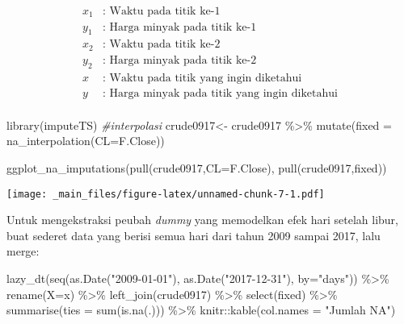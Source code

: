 \documentclass[
]{book}
\newenvironment{Shaded}{\begin{snugshade}}{\end{snugshade}}
\newcommand{\AttributeTok}[1]{\textcolor[rgb]{0.77,0.63,0.00}{#1}}
\newcommand{\CommentTok}[1]{\textcolor[rgb]{0.56,0.35,0.01}{\textit{#1}}}
\newcommand{\FunctionTok}[1]{\textcolor[rgb]{0.00,0.00,0.00}{#1}}
\newcommand{\NormalTok}[1]{#1}
\newcommand{\OtherTok}[1]{\textcolor[rgb]{0.56,0.35,0.01}{#1}}
\newcommand{\SpecialCharTok}[1]{\textcolor[rgb]{0.00,0.00,0.00}{#1}}
\newcommand{\StringTok}[1]{\textcolor[rgb]{0.31,0.60,0.02}{#1}}
\begin{document}
\[
\begin{aligned}
x_{1}&: \text{ Waktu pada titik ke-1}\\
y_{1}&: \text{ Harga minyak pada titik ke-1}\\
x_{2}&: \text{ Waktu pada titik ke-2}\\
y_{2}&: \text{ Harga minyak pada titik ke-2}\\
x&: \text{ Waktu pada titik yang ingin diketahui}\\
y&: \text{ Harga minyak pada titik yang ingin diketahui}\\
\end{aligned}
\]

\begin{Shaded}
\begin{Highlighting}[]
\FunctionTok{library}\NormalTok{(imputeTS)}
\CommentTok{\#interpolasi}
\NormalTok{crude0917}\OtherTok{\textless{}{-}}\NormalTok{ crude0917 }\SpecialCharTok{\%\textgreater{}\%} \FunctionTok{mutate}\NormalTok{(}\AttributeTok{fixed =} \FunctionTok{na\_interpolation}\NormalTok{(}\StringTok{\textasciigrave{}}\AttributeTok{CL=F.Close}\StringTok{\textasciigrave{}}\NormalTok{))}

\FunctionTok{ggplot\_na\_imputations}\NormalTok{(}\FunctionTok{pull}\NormalTok{(crude0917,}\StringTok{\textasciigrave{}}\AttributeTok{CL=F.Close}\StringTok{\textasciigrave{}}\NormalTok{),}
                      \FunctionTok{pull}\NormalTok{(crude0917,fixed))}
\end{Highlighting}
\end{Shaded}

\texttt{[image: \_main\_files/figure-latex/unnamed-chunk-7-1.pdf]}

Untuk mengekstraksi peubah \emph{dummy} yang memodelkan efek hari setelah libur, buat sederet data yang berisi semua hari dari tahun 2009 sampai 2017, lalu merge:

\begin{Shaded}
\begin{Highlighting}[]
\FunctionTok{lazy\_dt}\NormalTok{(}\FunctionTok{seq}\NormalTok{(}\FunctionTok{as.Date}\NormalTok{(}\StringTok{"2009{-}01{-}01"}\NormalTok{), }\FunctionTok{as.Date}\NormalTok{(}\StringTok{"2017{-}12{-}31"}\NormalTok{), }\AttributeTok{by=}\StringTok{"days"}\NormalTok{)) }\SpecialCharTok{\%\textgreater{}\%}
  \FunctionTok{rename}\NormalTok{(}\AttributeTok{X=}\NormalTok{x) }\SpecialCharTok{\%\textgreater{}\%} \FunctionTok{left\_join}\NormalTok{(crude0917) }\SpecialCharTok{\%\textgreater{}\%} \FunctionTok{select}\NormalTok{(fixed) }\SpecialCharTok{\%\textgreater{}\%} 
  \FunctionTok{summarise}\NormalTok{(}\AttributeTok{ties =} \FunctionTok{sum}\NormalTok{(}\FunctionTok{is.na}\NormalTok{(.))) }\SpecialCharTok{\%\textgreater{}\%}\NormalTok{ knitr}\SpecialCharTok{::}\FunctionTok{kable}\NormalTok{(}\AttributeTok{col.names =} \StringTok{"Jumlah NA"}\NormalTok{)}
\end{Highlighting}
\end{Shaded}
\end{document}
